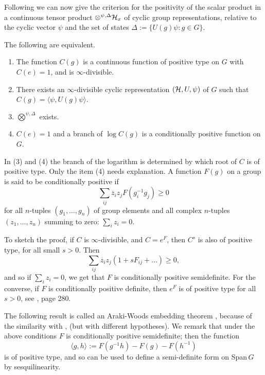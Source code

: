 Following \cite{RFS2} we can now give the criterion for the positivity
of the scalar product in a continuous tensor product $\otimes^{\psi,\Delta}
{\cal H}_x$ of cyclic group representations,
relative to the cyclic vector $\psi$ and the set of states
$\Delta:=\{U(g)\psi:g\in G\}$.
\begin{theorem}

The following are equivalent.
\begin{enumerate}
\item The function $C(g)$
is a continuous function of positive type on $G$ with
$C(e)=1$, and is $\infty$-divisible.
\item There exists an $\infty$-divisible cyclic representation
$({\cal H},U,\psi)$ of $G$ such that $C(g)=\langle\psi,U(g)\psi\rangle$.
\item $\bigotimes^{\psi,\Delta}$ exists.
\item $C(e)=1$ and a branch of $\log C(g)$ is a conditionally positive
function on $G$.
\end{enumerate}
\end{theorem}
In (3) and (4) the branch of the logarithm is determined by which root
of $C$ is of positive type.
Only the item (4) needs explanation. A function $F(g)$ on a group is said to be
conditionally positive if
\[\sum_{ij}\overline{z}_iz_jF(g_i^{-1}g_j)\geq 0\]
for all $n$-tuples $(g_1,\ldots,g_n)$ of group elements and all
complex $n$-tuples\\
$(z_1,\ldots,z_n)$ summing to zero: $\sum_iz_i=0$.

To sketch the proof, if
$C$ is $\infty$-divisible, and $C=e^F$, then $C^s$ is also of
positive type, for all small $s>0$. Then 
\begin{equation}
\sum_{ij}\overline{z}_iz_j(1+sF_{ij}+\ldots)\geq0,
\label{conditional}
\end{equation}
and so if $\sum_iz_i=0$, we get
that $F$ is conditionally positive semidefinite. For the converse,
if $F$ is conditionally positive definite, then $e^F$ is of
positive type for all $s>0$, see \cite{GelfandV}, page 280.

The following result is called an Araki-Woods
embedding theorem \cite{RFS2}, because of the similarity with
\cite{ArakiW}, (but with different hypotheses).
We remark that under the above
conditions $F$ is conditionally positive semidefinite; then the function
\begin{equation}
\langle g,h\rangle:=F(g^{-1}h)-F(g)-F(h^{-1})
\label{condition2}
\end{equation}
is of positive type, and so can be used to define a
semi-definite form on Span$\,G$ by sesquilinearity.

